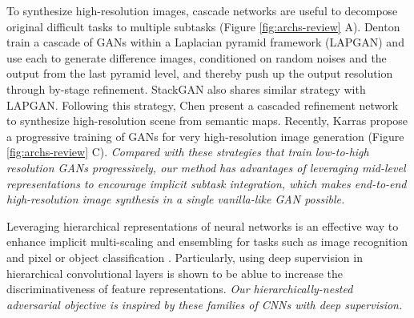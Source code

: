 \documentclass[10pt,twocolumn,letterpaper]{article}
\begin{document}

To synthesize high-resolution images, cascade networks are useful to decompose original difficult tasks to multiple subtasks (Figure \ref{fig:archs-review} A).
Denton \etal \cite{denton2015deep} train a cascade of GANs within a Laplacian pyramid framework (LAPGAN) and use each to generate difference images, conditioned on random noises and the output from the last pyramid level, and thereby push up the output resolution through by-stage refinement. StackGAN also shares similar strategy with LAPGAN. Following this strategy, Chen \etal \cite{chen2017photographic} present a cascaded refinement network to synthesize high-resolution scene from semantic maps. 
Recently, Karras \etal \cite{Karras2017progressive} propose a progressive training of GANs for very high-resolution image generation (Figure \ref{fig:archs-review} C). \textit{Compared with these strategies that train low-to-high resolution GANs progressively, our method has advantages of leveraging mid-level representations to encourage implicit subtask integration, which makes end-to-end high-resolution image synthesis in a single vanilla-like GAN possible.}


Leveraging hierarchical representations of neural networks is an effective way to enhance implicit multi-scaling and ensembling for tasks such as image recognition \cite{lee2015deeply} and pixel or object classification \cite{xie2015holistically,cai2016unified,long2015fully}. Particularly, using deep supervision \cite{lee2015deeply} in hierarchical convolutional layers is shown to be ablue to increase the discriminativeness of feature representations. 
\textit{Our hierarchically-nested adversarial objective is inspired by these families of CNNs with deep supervision. }
\end{document}
